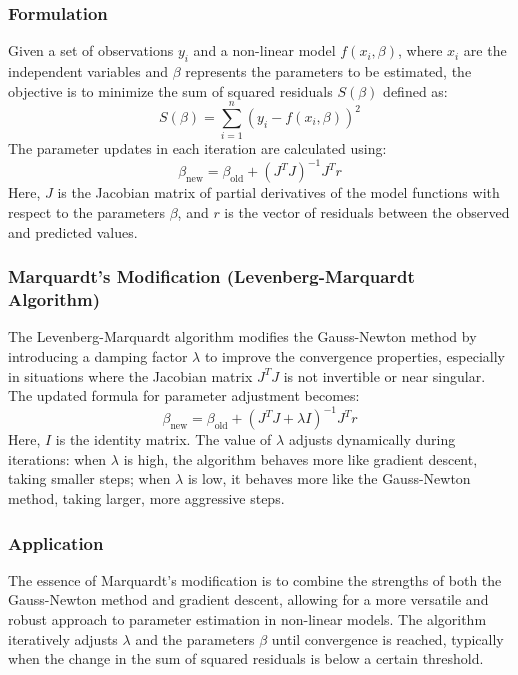 \documentclass[12pt]{article} %
\begin{document}
\subsubsection{Formulation}
Given a set of observations $y_i$ and a non-linear model $f(x_i, \beta)$, where $x_i$ are the independent variables and $\beta$ represents the parameters to be estimated, the objective is to minimize the sum of squared residuals $S(\beta)$ defined as:
\[
S(\beta) = \sum_{i=1}^n \left(y_i - f(x_i, \beta)\right)^2
\]
The parameter updates in each iteration are calculated using:
\[
\beta_{\text{new}} = \beta_{\text{old}} + (J^T J)^{-1} J^T r
\]
Here, $J$ is the Jacobian matrix of partial derivatives of the model functions with respect to the parameters $\beta$, and $r$ is the vector of residuals between the observed and predicted values.

\subsubsection{Marquardt's Modification (Levenberg-Marquardt Algorithm)}

The Levenberg-Marquardt algorithm modifies the Gauss-Newton method by introducing a damping factor $\lambda$ to improve the convergence properties, especially in situations where the Jacobian matrix $J^T J$ is not invertible or near singular. The updated formula for parameter adjustment becomes:
\[
\beta_{\text{new}} = \beta_{\text{old}} + (J^T J + \lambda I)^{-1} J^T r
\]
Here, $I$ is the identity matrix. The value of $\lambda$ adjusts dynamically during iterations: when $\lambda$ is high, the algorithm behaves more like gradient descent, taking smaller steps; when $\lambda$ is low, it behaves more like the Gauss-Newton method, taking larger, more aggressive steps.

\subsubsection{Application}
The essence of Marquardt's modification is to combine the strengths of both the Gauss-Newton method and gradient descent, allowing for a more versatile and robust approach to parameter estimation in non-linear models. The algorithm iteratively adjusts $\lambda$ and the parameters $\beta$ until convergence is reached, typically when the change in the sum of squared residuals is below a certain threshold.

\end{document}
